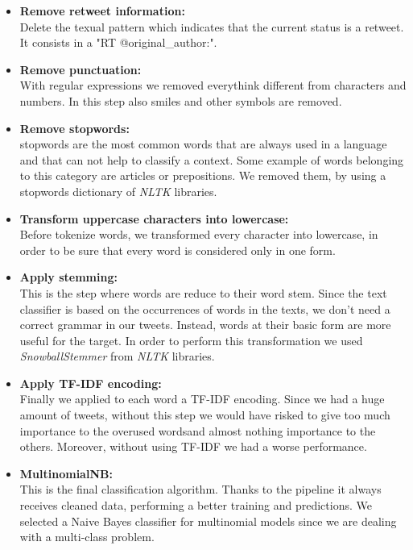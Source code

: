 \begin{itemize}
	\item[\PencilRight] \textbf{Remove retweet information:}\\
	Delete the texual pattern which indicates that the current status is a retweet. It consists in a "RT @original\_author:". 
	\item[\PencilRight] \textbf{Remove punctuation:}\\
	With regular expressions we removed everythink different from characters and numbers. In this step also smiles and other symbols are removed.
	\item[\PencilRight] \textbf{Remove stopwords:}\\
	stopwords are the most common words that are always used in a language and that can not help to classify a context. Some example of words belonging to this category are articles or prepositions.
	We removed them, by using a stopwords dictionary of \textit{NLTK} libraries.
	\item[\PencilRight] \textbf{Transform uppercase characters into lowercase:}\\
	Before tokenize words, we transformed every character into lowercase, in order to be sure that every word is considered only in one form.
	\item[\PencilRight] \textbf{Apply stemming:}\\
	This is the step where words are reduce to their word stem. Since the text classifier is based on the occurrences of words in the texts, we don't need a correct grammar in our tweets. Instead, words at their basic form are more useful for the target.
	In order to perform this transformation we used \textit{SnowballStemmer} from \textit{NLTK} libraries.
	\item[\PencilRight] \textbf{Apply TF-IDF encoding:}\\
	Finally we applied to each word a TF-IDF encoding. Since we had a huge amount of tweets, without this step we would have risked to give too much importance to the overused wordsand almost nothing importance to the others. Moreover, without using TF-IDF we had a worse performance.
	\item[\PencilRight] \textbf{MultinomialNB:}\\
	This is the final classification algorithm. Thanks to the pipeline it always receives cleaned data, performing a better training and predictions.
	We selected a Naive Bayes classifier for multinomial models since we are dealing with a multi-class problem.
\end{itemize}

